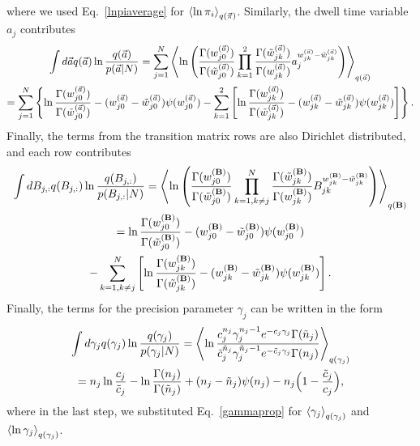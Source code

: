 where we used Eq.~\eqref{lnpiaverage} for
$\left\langle \ln \pi_i\right\rangle_{q(\vec{\pi})}$. Similarly, the dwell time variable
$a_j$ contributes
\begin{multline}
  \int d\vec{ a} q(\vec{ a}) \ln\frac{q(\vec{ a})}{p(\vec{ a}|N)}
  =\sum_{j=1}^N
  \left\langle \ln\left(\frac{\Gamma(w_{j0}^{(\vec{ a})})}{\Gamma(\tilde w_{j0}^{(\vec{ a})})}
    \prod_{k=1}^2\frac{\Gamma(\tilde w_{jk}^{(\vec{ a})})}{\Gamma(w_{jk}^{(\vec{ a})})}
     a_j^{w_{jk}^{(\vec{ a})}-\tilde w_{jk}^{(\vec{ a})}}\right)\right\rangle_{q(\vec{ a})}\\
  =\sum_{j=1}^N\left\{
  \ln\frac{\Gamma(w_{j0}^{(\vec{ a})})}{\Gamma(\tilde w_{j0}^{(\vec{ a})})}
  -(w_{j0}^{(\vec a)}-\tilde w_{j0}^{(\vec a)})\psi(w_{j0}^{(\vec{ a})})
  -\sum_{k=1}^2\left[\ln\frac{\Gamma(w_{jk}^{(\vec{ a})})}{\Gamma(\tilde w_{jk}^{(\vec{ a})})}
    -(w_{jk}^{(\vec{ a})}-\tilde w_{jk}^{(\vec{ a})})\psi(w_{jk}^{(\vec{ a})})\right]\right\}.
\end{multline}
Finally, the terms from the transition matrix rows are also Dirichlet
distributed, and each row contributes
\begin{multline}
  \int dB_{j,:} q(B_{j,:}) \ln\frac{q(B_{j,:})}{p(B_{j,:}|N)}
  =\left\langle \ln\left(\frac{\Gamma(w_{j0}^{(\mathbf{B})})}{\Gamma(\tilde w_{j0}^{(\mathbf{B})})}
    \prod_{k=1,k\ne j}^N\frac{\Gamma(\tilde w_{jk}^{(\mathbf{B})})}{\Gamma(w_{jk}^{(\mathbf{B})})}
    B_{jk}^{w_{jk}^{(\mathbf{B})}-\tilde w_{jk}^{(\mathbf{B})}}\right)\right\rangle_{q(\mathbf{B})}\\
  =\ln\frac{\Gamma(w_{j0}^{(\mathbf{B})})}{\Gamma(\tilde w_{j0}^{(\mathbf{B})})}
  -(w_{j0}^{(\mathbf{B})}-\tilde w_{j0}^{(\mathbf{B})})\psi(w_{j0}^{(\mathbf{B})})\\
  -\sum_{k=1,k\ne j}^N\left[\ln\frac{\Gamma(w_{jk}^{(\mathbf{B})})}{\Gamma(\tilde w_{jk}^{(\mathbf{B})})}
    -(w_{jk}^{(\mathbf{B})}-\tilde w_{jk}^{(\mathbf{B})})\psi(w_{jk}^{(\mathbf{B})})
\right].
\end{multline}
Finally, the terms for the precision parameter $\gamma_j$ can be
written in the form
\begin{multline}
\int d\gamma_j q(\gamma_j)\ln\frac{q(\gamma_j)}{p(\gamma_j|N)}
=\left\langle \ln\frac{c_j^{n_j}\gamma_j^{n_j-1}e^{-c_j\gamma_j}\Gamma(\tilde n_j)}
      {\tilde c_j^{\tilde n_j}\gamma_j^{\tilde n_j-1}e^{-\tilde c_j\gamma_j}\Gamma(n_j)}\right\rangle_{q(\gamma_j)}\\
=n_j\ln\frac{c_j}{\tilde c_j}                    
-\ln\frac{\Gamma(n_j)}{\Gamma(\tilde n_j)}
+(n_j-\tilde n_j)\psi(n_j)
-n_j\Big(1-\frac{\tilde c_j}{c_j}\Big),
\end{multline}
where in the last step, we substituted Eq.~\eqref{gammaprop} for
$\left\langle \gamma_j\right\rangle_{q(\gamma_j)}$ and
$\left\langle \ln\gamma_j\right\rangle_{q(\gamma_j)}$.

